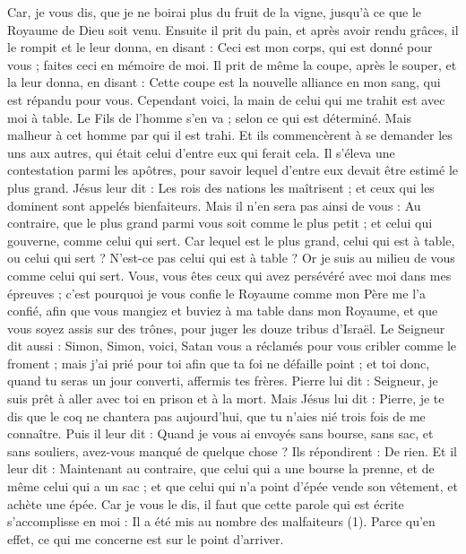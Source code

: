 \begin{multicols}{2}
Car, je vous dis, que je ne boirai plus du fruit de la vigne, jusqu'à ce que le Royaume de Dieu soit venu.
Ensuite il prit du pain, et après avoir rendu grâces, il le rompit et le leur donna, en disant : Ceci est mon corps, qui est donné pour vous ; faites ceci en mémoire de moi.
Il prit de même la coupe, après le souper, et la leur donna, en disant : Cette coupe est la nouvelle alliance en mon sang, qui est répandu pour vous.
Cependant voici, la main de celui qui me trahit est avec moi à table.
Le Fils de l'homme s'en va ; selon ce qui est déterminé. Mais malheur à cet homme par qui il est trahi.
Et ils commencèrent à se demander les uns aux autres, qui était celui d’entre eux qui ferait cela.
Il s’éleva une contestation parmi les apôtres, pour savoir lequel d'entre eux devait être estimé le plus grand.
Jésus leur dit : Les rois des nations les maîtrisent ; et ceux qui les dominent sont appelés bienfaiteurs.
Mais il n'en sera pas ainsi de vous : Au contraire, que le plus grand parmi vous soit comme le plus petit ; et celui qui gouverne, comme celui qui sert.
Car lequel est le plus grand, celui qui est à table, ou celui qui sert ? N'est-ce pas celui qui est à table ? Or je suis au milieu de vous comme celui qui sert.
Vous, vous êtes ceux qui avez persévéré avec moi dans mes épreuves ;
c’est pourquoi je vous confie le Royaume comme mon Père me l'a confié,
afin que vous mangiez et buviez à ma table dans mon Royaume, et que vous soyez assis sur des trônes, pour juger les douze tribus d'Israël.
Le Seigneur dit aussi : Simon, Simon, voici, Satan vous a réclamés pour vous cribler comme le froment ;
mais j'ai prié pour toi afin que ta foi ne défaille point ; et toi donc, quand tu seras un jour converti, affermis tes frères.
Pierre lui dit : Seigneur, je suis prêt à aller avec toi en prison et à la mort.
Mais Jésus lui dit : Pierre, je te dis que le coq ne chantera pas aujourd'hui, que tu n’aies nié trois fois de me connaître.
Puis il leur dit : Quand je vous ai envoyés sans bourse, sans sac, et sans souliers, avez-vous manqué de quelque chose ? Ils répondirent : De rien.
Et il leur dit : Maintenant au contraire, que celui qui a une bourse la prenne, et de même celui qui a un sac ; et que celui qui n'a point d'épée vende son vêtement, et achète une épée.
Car je vous le dis, il faut que cette parole qui est écrite s’accomplisse en moi : Il a été mis au nombre des malfaiteurs (1). Parce qu’en effet, ce qui me concerne est sur le point d’arriver.

\end{multicols}
